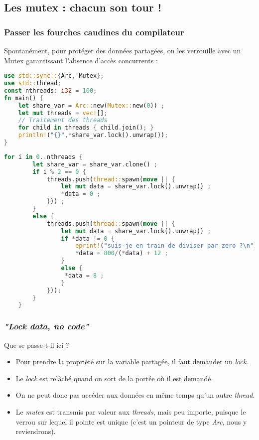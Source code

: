 \subsection{Les mutex : chacun son tour !}
\begin{frame}[fragile]
  \frametitle{Passer les fourches caudines du compilateur}
Spontanément, pour protéger des données partagées, on les verrouille avec un Mutex garantissant l'absence d'accès concurrents :
\begin{lstlisting}[language=rust, basicstyle=\tiny{}]
use std::sync::{Arc, Mutex};
use std::thread;
const nthreads: i32 = 100;
fn main() {
    let share_var = Arc::new(Mutex::new(0)) ;
    let mut threads = vec![];
    // Traitement des threads
    for child in threads { child.join(); }
    println!("{}",*share_var.lock().unwrap());
}
\end{lstlisting}
\end{frame}
\begin{frame}[fragile]
  \begin{lstlisting}[language=rust, basicstyle=\tiny{}]
    for i in 0..nthreads {
        let share_var = share_var.clone() ;
        if i % 2 == 0 {
            threads.push(thread::spawn(move || {
                let mut data = share_var.lock().unwrap() ;
                *data = 0 ;
            })) ;
        }
        else {
            threads.push(thread::spawn(move || {
                let mut data = share_var.lock().unwrap() ;
                if *data != 0 {
                    eprint!("suis-je en train de diviser par zero ?\n");
                    *data = 800/(*data) + 12 ;
                }
                else {
                 *data = 8 ;
                }
            }));
        }
    }
  \end{lstlisting}
\end{frame}
\begin{frame}[fragile]
  \frametitle{\textit{"Lock data, no code"}}
Que se passe-t-il ici ?
\begin{itemize}
\item Pour prendre la propriété sur la variable partagée, il faut demander un \textit{lock}.
\item Le \textit{lock} est relâché quand on sort de la portée où il est demandé.
\item On ne peut donc pas accéder aux données en même temps qu'un autre \textit{thread}.
\item Le \textit{mutex} est transmis par valeur aux \textit{threads}, mais peu importe, puisque le verrou sur lequel il pointe est unique (c'est un pointeur de type \textit{Arc}, nous y reviendrons).
\end{itemize}
\end{frame}
